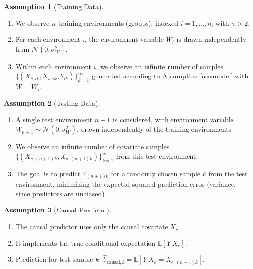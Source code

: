 \documentclass{article}
\theoremstyle{plain}
\theoremstyle{definition}
\newtheorem{assumption}{Assumption}[section]
\theoremstyle{remark}
\newcommand{\E}{\mathbb{E}}
\newcommand{\N}{\mathcal{N}} %
\begin{document}
\begin{assumption}[Training Data]\label{ass:train}
\begin{enumerate}
    \item We observe $n$ training environments (groups), indexed $i=1, \dots, n$, with $n>2$.
    \item For each environment $i$, the environment variable $W_i$ is drawn independently from $\N(0, \sigma_W^2)$.
    \item Within each environment $i$, we observe an infinite number of samples $\{ (X_{c,ik}, X_{s,ik}, Y_{ik}) \}_{k=1}^\infty$ generated according to Assumption \ref{ass:model} with $W = W_i$.
\end{enumerate}
\end{assumption}

\begin{assumption}[Testing Data]\label{ass:test}
\begin{enumerate}
    \item A single test environment $n+1$ is considered, with environment variable $W_{n+1} \sim \N(0, \sigma_W^2)$, drawn independently of the training environments.
    \item We observe an infinite number of covariate samples $\{ (X_{c,(n+1)k}, X_{s,(n+1)k}) \}_{k=1}^\infty$ from this test environment.
    \item The goal is to predict $Y_{(n+1)k}$ for a randomly chosen sample $k$ from the test environment, minimizing the expected squared prediction error (variance, since predictors are unbiased).
\end{enumerate}
\end{assumption}

\begin{assumption}[Causal Predictor]\label{ass:causal}
\begin{enumerate}
    \item The causal predictor uses only the causal covariate $X_c$.
    \item It implements the true conditional expectation $\E[Y | X_c]$.
    \item Prediction for test sample $k$: $\hat{Y}_{\text{causal}, k} = \E[Y | X_c = X_{c,(n+1)k}]$.
\end{enumerate}
\end{assumption}
\end{document}
